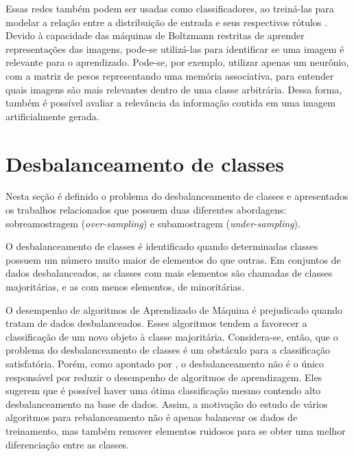 
Essas redes também podem ser usadas como classificadores, ao treiná-las para modelar a relação entre a distribuição de entrada e seus respectivos rótulos \cite{Fischer2014}. Devido à capacidade das máquinas de Boltzmann restritas de aprender representações das imagens, pode-se utilizá-las para identificar se uma imagem é relevante para o aprendizado. Pode-se, por exemplo, utilizar apenas um neurônio, com a matriz de pesos representando uma memória associativa, para entender quais imagens são mais relevantes dentro de uma classe arbitrária. Dessa forma, também é possível avaliar a relevância da informação contida em uma imagem artificialmente gerada.

\section{Desbalanceamento de classes}
\label{cap:desbalanceamento}

Nesta seção é definido o problema do desbalanceamento de classes e apresentados os trabalhos relacionados que possuem duas diferentes abordagens: sobreamostragem (\textit{over-sampling}) e subamostragem (\textit{under-sampling}).

O desbalanceamento de classes é identificado quando determinadas classes possuem um número muito maior de elementos do que outras. Em conjuntos de dados desbalanceados, as classes com mais elementos são chamadas de classes majoritárias, e as com menos elementos, de minoritárias.


O desempenho de algoritmos de Aprendizado de Máquina é prejudicado quando tratam de dados desbalanceados. Esses algoritmos tendem a favorecer a classificação de um novo objeto à classe majoritária. Considera-se, então, que o problema do desbalanceamento de classes é um obstáculo para a classificação satisfatória. Porém, como apontado por , o desbalanceamento não é o único responsável por reduzir o desempenho de algoritmos de aprendizagem. Eles sugerem que é possível haver uma ótima classificação mesmo contendo alto desbalanceamento na base de dados. Assim, a motivação do estudo de vários algoritmos para rebalanceamento não é apenas balancear os dados de treinamento, mas também remover elementos ruidosos para se obter uma melhor diferenciação entre as classes.

